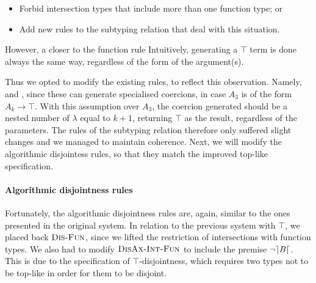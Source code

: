 \begin{itemize}
\item Forbid intersection types that include more than one function type; or
\item Add new rules to the subtyping relation that deal with this situation. 
\end{itemize}

However, a closer to the function rule 
Intuitively, generating a $\top$ term is done always the same way, regardless of the form of the argument(s).

Thus we opted to modify the existing rules, to reflect this observation.
Namely,  and , since these can generate specialised coercions,
in case $A_3$ is of the form $A_k \to \top$. 
With this assumption over $A_3$, the coercion generated should be a nested number of $\lambda$ equal to $k+1$,
returning $\top$ as the result, regardless of the parameters.
The rules of the subtyping relation therefore only suffered slight changes and we managed to maintain coherence.
Next, we will modify the algorithmic disjointess rules, so that they match the improved top-like specification.

\paragraph{Algorithmic disjointness rules}

Fortunately, the algorithmic disjointness rules are, again, similar to the ones presented in the original system.
In relation to the previous system with $\top$, we placed back $\textsc{Dis-Fun}$, since we lifted the restriction
of intersections with function types.
We also had to modify $\textsc{DisAx-Int-Fun}$ to include the premise $\neg \rceil B \lceil$.
This is due to the specification of $\top$-disjointness, which requires two types not to be top-like in order for them to 
be disjoint.


